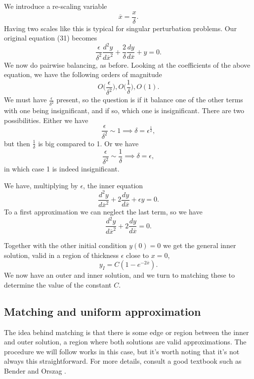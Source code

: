 \documentclass[12pt]{article}
\begin{document}
We introduce a re-scaling variable
\begin{equation}
\overline{x} = \frac{x}{\delta}.
\end{equation}
Having two scales like this is typical for singular perturbation problems. Our
original equation (31) becomes
\begin{equation}
\frac{\epsilon}{\delta^2} \frac{d^2y}{d\overline{x}^2} + \frac{2}{\delta}
\frac{dy}{d\overline{x}} + y = 0.
\end{equation}
We now do pairwise balancing, as before. Looking at the coefficients
of the above equation, we have the following orders of magnitude
\begin{equation}
O\Big(\frac{\epsilon}{\delta^2}\Big), O\Big(\frac{1}{\delta}\Big), O(1).
\end{equation}
We must have $\frac{\epsilon}{\delta^2}$ present, so the question is
if it balance one of the other terms with one being insignificant, and
if so, which one is insignificant. There are two possibilities. Either
we have
\begin{equation}
\frac{\epsilon}{\delta^2} \sim 1 \implies \delta = \epsilon^{\frac{1}{2}},
\end{equation}
but then $\frac{1}{\delta}$ is big compared to 1. Or we have
\begin{equation}
\frac{\epsilon}{\delta^2} \sim \frac{1}{\delta} \implies \delta = \epsilon,
\end{equation}
in which case 1 is indeed insignificant.

We have, multiplying by $\epsilon$, the inner equation
\begin{equation}
\frac{d^2 y}{d \overline{x}^2} + 2 \frac{dy}{d\overline{x}} + \epsilon
y = 0.
\end{equation}
To a first approximation we can neglect the last term, so we have
\begin{equation}
\frac{d^2 y}{d \overline{x}^2} + 2 \frac{dy}{d\overline{x}} = 0.
\end{equation}

Together with the other initial condition $y(0)=0$ we get the general inner
solution, valid in a region of thickness $\epsilon$ close to $x=0$,
\begin{equation}
y_I = C(1 - e^{-2\overline{x}}).
\end{equation}
We now have an outer and inner solution, and we turn to matching these
to determine the value of the constant $C$.

\newpage
\subsection{Matching and uniform approximation}
The idea behind matching is that there is some edge or region between
the inner and outer solution, a region where both solutions are valid
approximations. The procedure we will follow works in this case, but
it's worth noting that it's not always this straightforward. For more
details, consult a good textbook such as Bender and Orszag
\cite{bender1999advanced}.
\end{document}
